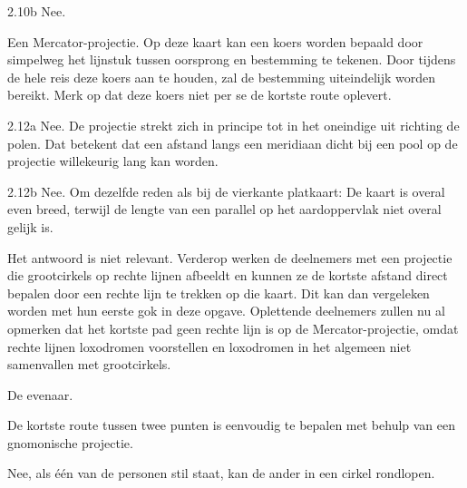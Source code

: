 \begin{Antwoord}{2.10b}
			Nee.
		
\end{Antwoord}
\begin{Antwoord}{2.11}
		Een Mercator-projectie. Op deze kaart kan een koers worden bepaald door simpelweg het lijnstuk tussen oorsprong en bestemming te tekenen. Door tijdens de hele reis deze koers aan te houden, zal de bestemming uiteindelijk worden bereikt. Merk op dat deze koers niet per se de kortste route oplevert.
	
\end{Antwoord}
\begin{Antwoord}{2.12a}
			Nee. De projectie strekt zich in principe tot in het oneindige uit richting de polen. Dat betekent dat een afstand langs een meridiaan dicht bij een pool op de projectie willekeurig lang kan worden.
		
\end{Antwoord}
\begin{Antwoord}{2.12b}
			Nee. Om dezelfde reden als bij de vierkante platkaart: De kaart is overal even breed, terwijl de lengte van een parallel op het aardoppervlak niet overal gelijk is.
		
\end{Antwoord}
\begin{Antwoord}{2.13}
		Het antwoord is niet relevant. Verderop werken de deelnemers met een projectie die grootcirkels op rechte lijnen afbeeldt en kunnen ze de kortste afstand direct bepalen door een rechte lijn te trekken op die kaart. Dit kan dan vergeleken worden met hun eerste gok in deze opgave. Oplettende deelnemers zullen nu al opmerken dat het kortste pad geen rechte lijn is op de Mercator-projectie, omdat rechte lijnen loxodromen voorstellen en loxodromen in het algemeen niet samenvallen met grootcirkels.
	
\end{Antwoord}
\begin{Antwoord}{2.14}
		De evenaar.
	
\end{Antwoord}
\begin{Antwoord}{2.15}
		De kortste route tussen twee punten is eenvoudig te bepalen met behulp van een gnomonische projectie.
	
\end{Antwoord}
\begin{Antwoord}{4.1}
		Nee, als \'e\'en van de personen stil staat, kan de ander in een cirkel rondlopen.
	
\end{Antwoord}
